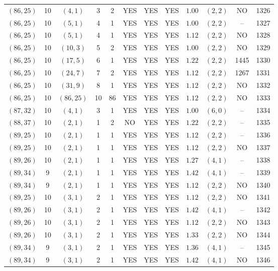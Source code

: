 \begin{longtable}{|c|c|c|c|c|c|c|c|c|c|c|c|}
$(86,25)$ & 10 & $(4,1)$ & 3 & 2 & YES & YES & YES & $1.00$ & $(2,2)$ & NO & 1326\\
$(86,25)$ & 10 & $(5,1)$ & 4 & 1 & YES & YES & YES & $1.00$ & $(2,2)$ & -- & 1327\\
$(86,25)$ & 10 & $(5,1)$ & 4 & 1 & YES & YES & YES & $1.12$ & $(2,2)$ & NO & 1328\\
$(86,25)$ & 10 & $(10,3)$ & 5 & 2 & YES & YES & YES & $1.00$ & $(2,2)$ & NO & 1329\\
$(86,25)$ & 10 & $(17,5)$ & 6 & 1 & YES & YES & YES & $1.22$ & $(2,2)$ & 1445 & 1330\\
$(86,25)$ & 10 & $(24,7)$ & 7 & 2 & YES & YES & YES & $1.12$ & $(2,2)$ & 1267 & 1331\\
$(86,25)$ & 10 & $(31,9)$ & 8 & 1 & YES & YES & YES & $1.12$ & $(2,2)$ & NO & 1332\\
$(86,25)$ & 10 & $(86,25)$ & 10 & 86 & YES & YES & YES & $1.12$ & $(2,2)$ & NO & 1333\\
$(87,32)$ & 10 & $(4,1)$ & 3 & 1 & YES & YES & YES & $1.00$ & $(6,0)$ & -- & 1334\\
$(88,37)$ & 10 & $(2,1)$ & 1 & 2 & NO & YES & YES & $1.22$ & $(2,2)$ & -- & 1335\\
$(89,25)$ & 10 & $(2,1)$ & 1 & 1 & YES & YES & YES & $1.12$ & $(2,2)$ & -- & 1336\\
$(89,25)$ & 10 & $(2,1)$ & 1 & 1 & YES & YES & YES & $1.12$ & $(2,2)$ & NO & 1337\\
$(89,26)$ & 10 & $(2,1)$ & 1 & 1 & YES & YES & YES & $1.27$ & $(4,1)$ & -- & 1338\\
$(89,34)$ & 9 & $(2,1)$ & 1 & 1 & YES & YES & YES & $1.42$ & $(4,1)$ & -- & 1339\\
$(89,34)$ & 9 & $(2,1)$ & 1 & 1 & YES & YES & YES & $1.12$ & $(2,2)$ & NO & 1340\\
$(89,25)$ & 10 & $(3,1)$ & 2 & 1 & YES & YES & YES & $1.12$ & $(2,2)$ & NO & 1341\\
$(89,26)$ & 10 & $(3,1)$ & 2 & 1 & YES & YES & YES & $1.42$ & $(4,1)$ & -- & 1342\\
$(89,26)$ & 10 & $(3,1)$ & 2 & 1 & YES & YES & YES & $1.12$ & $(2,2)$ & NO & 1343\\
$(89,26)$ & 10 & $(3,1)$ & 2 & 1 & YES & YES & YES & $1.33$ & $(2,2)$ & NO & 1344\\
$(89,34)$ & 9 & $(3,1)$ & 2 & 1 & YES & YES & YES & $1.36$ & $(4,1)$ & -- & 1345\\
$(89,34)$ & 9 & $(3,1)$ & 2 & 1 & YES & YES & YES & $1.42$ & $(4,1)$ & NO & 1346\\

\end{longtable}
